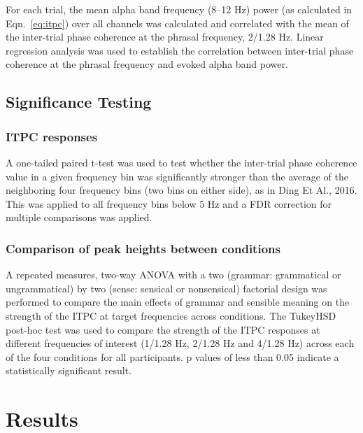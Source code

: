 \documentclass[10pt,letterpaper]{article}
\begin{document}

For each trial, the mean alpha band frequency (8–12 Hz) power (as
calculated in Eqn.~\ref{eq:itpc}) over all channels was calculated and
correlated with the mean of the inter-trial phase coherence at the
phrasal frequency, 2/1.28 Hz. Linear regression analysis was used to
establish the correlation between inter-trial phase coherence at the
phrasal frequency and evoked alpha band power.

\subsection*{Significance Testing}

\subsubsection*{ITPC responses}
A one-tailed paired t-test was used to test whether the inter-trial phase coherence value in a given frequency bin was significantly stronger than the average of the neighboring four frequency bins (two bins on either side), as in Ding Et Al., 2016. This was applied to all frequency bins below 5 Hz and a FDR correction for multiple comparisons was applied. 


\subsubsection*{Comparison of peak heights between conditions}
A repeated measures, two-way ANOVA with a two (grammar: grammatical or ungrammatical) by two (sense: sensical or nonsensical) factorial design was performed to compare the main effects of grammar and sensible meaning on the strength of the ITPC at target frequencies across conditions. The TukeyHSD post-hoc test was used to compare the strength of the ITPC responses at different frequencies of interest (1/1.28 Hz, 2/1.28 Hz and 4/1.28 Hz) across each of the four conditions for all participants. p values of less than 0.05 indicate a statistically significant result.


\section*{Results}
\end{document}
